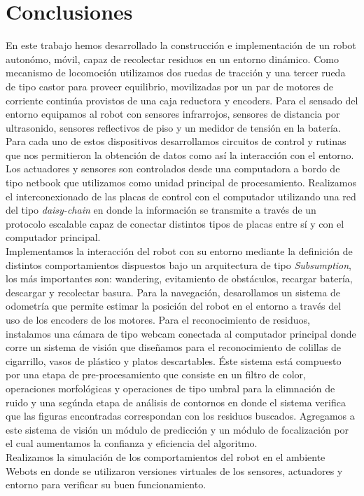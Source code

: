 
\section{\label{sec:conclusiontotal} Conclusiones}
\label{sec:conclusiontotal}
En este trabajo hemos desarrollado la construcci\'on e implementaci\'on
de un robot auton\'omo, m\'ovil, capaz de recolectar residuos en un entorno din\'amico. 
Como mecanismo de locomoci\'on utilizamos dos ruedas de tracci\'on y una 
tercer rueda de tipo castor para proveer equilibrio, movilizadas por un 
par de motores de corriente contin\'ua provistos de una caja reductora y encoders. 
Para el sensado del entorno equipamos al robot con sensores 
infrarrojos, sensores de distancia por ultrasonido, sensores reflectivos 
de piso y un medidor de tensi\'on en la bater\'ia. Para cada uno de estos 
dispositivos desarrollamos circuitos de control y rutinas que nos permitieron 
la obtenci\'on de datos como as\'i la interacci\'on con el entorno. 
Los actuadores y sensores son controlados desde una computadora a bordo de tipo
netbook que utilizamos como unidad principal de procesamiento. 
Realizamos el interconexionado de las placas de control con el computador
utilizando una red del tipo \emph{daisy-chain} en donde la informaci\'on se transmite 
a trav\'es de un protocolo escalable capaz de conectar distintos tipos de 
placas entre s\'i y con el computador principal.\\
\indent  Implementamos la interacci\'on del 
robot con su entorno mediante la definici\'on de distintos comportamientos dispuestos 
bajo un arquitectura de tipo \emph{Subsumption}, los m\'as importantes son: 
wandering, evitamiento de obst\'aculos, recargar bater\'ia, descargar y recolectar basura.
Para la navegaci\'on, desarollamos
un sistema de odometr\'ia que permite estimar la posici\'on del robot en 
el entorno a trav\'es del uso de los encoders de los motores.
Para el reconocimiento de residuos, instalamos una c\'amara de tipo webcam 
conectada al computador principal donde corre un sistema de visi\'on que 
dise\~namos para el reconocimiento de colillas de cigarrillo, vasos de pl\'astico 
y platos descartables. \'Este sistema est\'a compuesto por una etapa de 
pre-procesamiento que consiste en un filtro de color, operaciones morfol\'ogicas 
y operaciones de tipo umbral para la elimnaci\'on de ruido y una seg\'unda 
etapa de an\'alisis de contornos en donde el sistema verifica que las figuras encontradas 
correspondan con los residuos buscados. Agregamos a este sistema de 
visi\'on un m\'odulo de predicci\'on y un m\'odulo de focalizaci\'on por 
el cual aumentamos la confianza y eficiencia del algoritmo. \\ 
\indent Realizamos la simulaci\'on de los comportamientos del robot en el 
ambiente Webots en donde se utilizaron versiones virtuales de los sensores, actuadores y entorno 
para verificar su buen funcionamiento. \\

